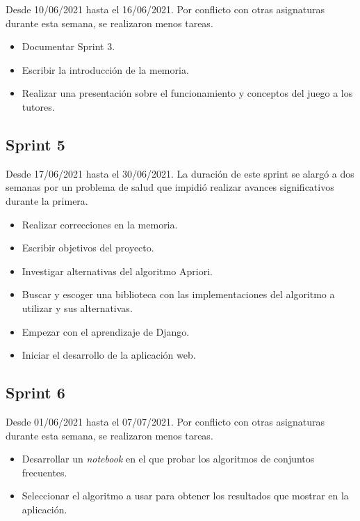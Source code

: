 Desde 10/06/2021 hasta el 16/06/2021. Por conflicto con otras asignaturas durante esta semana, se realizaron menos tareas.

\begin{itemize}
    \item Documentar Sprint 3.
    \item Escribir la introducción de la memoria.
    \item Realizar una presentación sobre el funcionamiento y conceptos del juego a los tutores.
\end{itemize}

\subsection{Sprint 5}

Desde 17/06/2021 hasta el 30/06/2021. La duración de este sprint se alargó a dos semanas por un problema de salud que impidió realizar avances significativos durante la primera.

\begin{itemize}
    \item Realizar correcciones en la memoria.
    \item Escribir objetivos del proyecto.
    \item Investigar alternativas del algoritmo Apriori.
    \item Buscar y escoger una biblioteca con las implementaciones del algoritmo a utilizar y sus alternativas.
    \item Empezar con el aprendizaje de Django.
    \item Iniciar el desarrollo de la aplicación web.
\end{itemize}

\subsection{Sprint 6}

Desde 01/06/2021 hasta el 07/07/2021. Por conflicto con otras asignaturas durante esta semana, se realizaron menos tareas.

\begin{itemize}
    \item Desarrollar un \textit{notebook} en el que probar los algoritmos de conjuntos frecuentes.
    \item Seleccionar el algoritmo a usar para obtener los resultados que mostrar en la aplicación.
\end{itemize}

